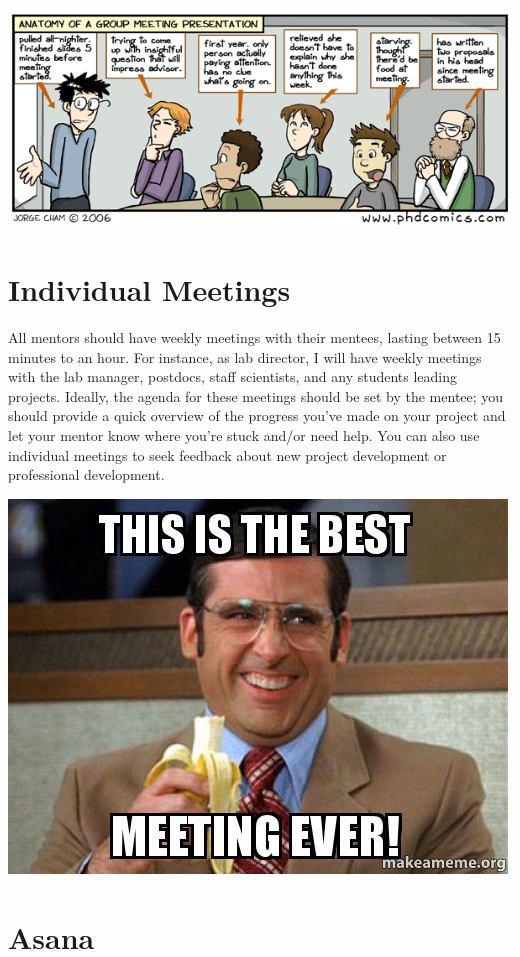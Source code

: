 \documentclass[]{book}
\begin{document}
\includegraphics{images/labmeeting.gif}

\hypertarget{individual-meetings}{%
\section{Individual Meetings}\label{individual-meetings}}

All mentors should have weekly meetings with their mentees, lasting between 15 minutes to an hour. For instance, as lab director, I will have weekly meetings with the lab manager, postdocs, staff scientists, and any students leading projects. Ideally, the agenda for these meetings should be set by the mentee; you should provide a quick overview of the progress you've made on your project and let your mentor know where you're stuck and/or need help. You can also use individual meetings to seek feedback about new project development or professional development.

\includegraphics{images/best_meeting.jpg}

\hypertarget{asana}{%
\section{Asana}\label{asana}}
\end{document}

